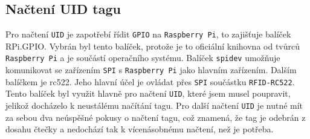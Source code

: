 \documentclass[czech,BP]{thesiskiv}
\begin{document}
	\subsection{Načtení UID tagu}
Pro načtení \texttt{UID} je zapotřebí řídit \texttt{GPIO} na \texttt{Raspberry Pi}, to zajišťuje balíček RPi.GPIO. Vybrán byl tento balíček, protože je to oficiální knihovna od tvůrců \texttt{Raspberry Pi} a je součástí operačního systému.
Balíček \texttt{spidev} umožňuje komunikovat se zařízením \texttt{SPI} s \texttt{Raspberry Pi} jako hlavním zařízením. 
Dalším balíčkem je rc522. Jeho hlavní účel je ovládat přes \texttt{SPI} součástku \texttt{RFID-RC522}. Tento balíček byl využit hlavně pro načtení \texttt{UID}, které jsem musel poupravit, jelikož docházelo k neustálému načítání tagu. 
Pro další načtení \texttt{UID} je nutné mít za sebou dva neúspěšné pokusy o načtení tagu, což znamená, že tag je odebrán z dosahu čtečky a nedochází tak k vícenásobnému načtení, než je potřeba.
\end{document}
